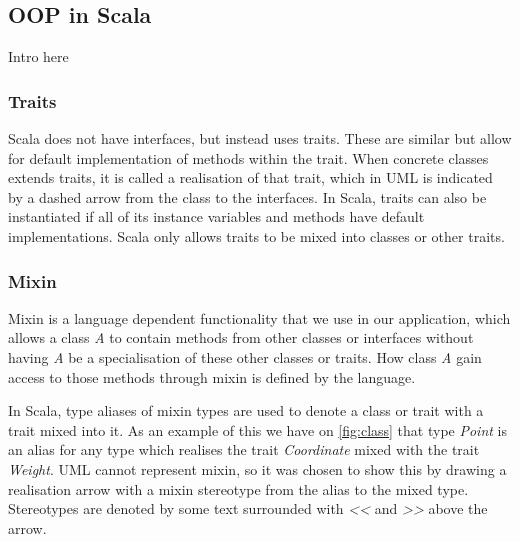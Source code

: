 \subsection{OOP in Scala}
Intro here

\subsubsection{Traits}
Scala does not have interfaces, but instead uses traits. These are similar but allow for default implementation of methods within the trait. When concrete classes extends traits, it is called a realisation of that trait, which in UML is indicated by a dashed arrow from the class to the interfaces. In Scala, traits can also be instantiated if all of its instance variables and methods have default implementations. Scala only allows traits to be mixed into classes or other traits.

\subsubsection{Mixin}
Mixin is a language dependent functionality that we use in our application, which allows a class \emph{A} to contain methods from other classes or interfaces without having \emph{A} be a specialisation of these other classes or traits. How class \emph{A} gain access to those methods through mixin is defined by the language. 

In Scala, type aliases of mixin types are used to denote a class or trait with a trait mixed into it. As an example of this we have on \cref{fig:class} that type \emph{Point} is an alias for any type which realises the trait \emph{Coordinate} mixed with the trait \emph{Weight}. UML cannot represent mixin, so it was chosen to show this by drawing a realisation arrow with a mixin stereotype from the alias to the mixed type. Stereotypes are denoted by some text surrounded with \emph{<<} and \emph{>>} above the arrow.

